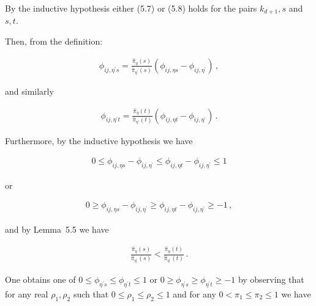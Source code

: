 \documentclass[10pt,a4paper]{article}
\begin{document}
By the inductive hypothesis either (5.7) or (5.8) holds for the pairs $k_{d+1},s$ and $s,t$.\par




Then, from the definition:\par


\[\begin{gathered}
\displaystyle\phi_{ij,\eta^{\prime}s} \displaystyle=\frac{\hat{\pi}_{\eta}(s)}{\hat{\pi}_{\eta^{\prime}}(s)}(\phi_{ij,\eta s}-\phi_{ij,\eta^{\prime}})\,,
\end{gathered}\]


and similarly\par


\[\begin{gathered}
\displaystyle\phi_{ij,\eta^{\prime}t} \displaystyle=\frac{\hat{\pi}_{\eta}(t)}{\hat{\pi}_{\eta^{\prime}}(t)}(\phi_{ij,\eta t}-\phi_{ij,\eta^{\prime}})\,.
\end{gathered}\]




Furthermore, by the inductive hypothesis we have\par


\[\begin{gathered}
\displaystyle 0\leq\phi_{ij,\eta s}-\phi_{ij,\eta^{\prime}}\leq\phi_{ij,\eta t}-\phi_{ij,\eta^{\prime}}\leq 1
\end{gathered}\]


or\par


\[\begin{gathered}
\displaystyle 0\geq\phi_{ij,\eta s}-\phi_{ij,\eta^{\prime}}\geq\phi_{ij,\eta t}-\phi_{ij,\eta^{\prime}}\geq-1\,,
\end{gathered}\]


and by Lemma 5.5 we have\par


\[\begin{gathered}
\displaystyle\frac{\hat{\pi}_{\eta}(s)}{\hat{\pi}_{\eta^{\prime}}(s)}<\frac{\hat{\pi}_{\eta}(t)}{\hat{\pi}_{\eta^{\prime}}(t)}\,.
\end{gathered}\]


One obtains one of $0\leq\phi_{\eta^{\prime}s}\leq\phi_{\eta^{\prime}t}\leq 1$ or $0\geq\phi_{\eta^{\prime}s}\geq\phi_{\eta^{\prime}t}\geq-1$ by observing that for any real $\rho_{1},\rho_{2}$ such that $0\leq\rho_{1}\leq\rho_{2}\leq 1$ and for any $0<\pi_{1}\leq\pi_{2}\leq 1$ we have\par
\end{document}
